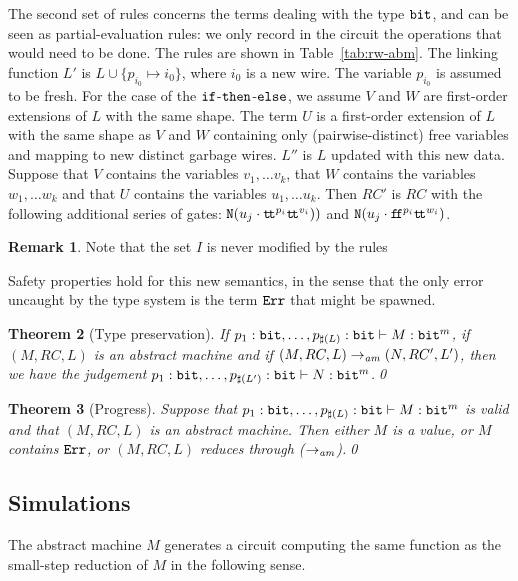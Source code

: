 \documentclass{article}
\theoremstyle{plain}
\newtheorem{theorem}{Theorem}
\theoremstyle{definition}
\newtheorem{remark}[theorem]{Remark}
\newcommand{\bit}{{\tt bit}}
\newcommand{\cnotgate}[2]{{\tt N}({#1}\cdot{#2})}
\newcommand{\ttrue}{\mathtt{t\!t}}
\newcommand{\ffalse}{\mathtt{f\!f}}
\newcommand{\errorlist}{{\tt Err}}
\newcommand{\rwam}{\mathrel{\to_{\it am}}}
\begin{document}
The second set of rules concerns the terms dealing with the type
$\bit$, and can be seen as partial-evaluation rules: we only record
in the circuit
the operations that would need to be done. The rules are shown
in Table~\ref{tab:rw-abm}.  The linking function $L'$ is
$L\cup\{p_{i_0}\mapsto i_0\}$, where $i_0$ is a new wire. The
variable $p_{i_0}$ is assumed to be fresh. 
For the case of the ${\tt if}$-${\tt then}$-${\tt else}$, we assume
$V$ and $W$ are first-order extensions of $L$ with the same shape. The
term $U$ is a first-order extension of $L$ with the same shape as $V$
and $W$ containing only (pairwise-distinct) free variables and mapping
to new distinct garbage wires. $L''$ is $L$ updated with this new
data.  Suppose that $V$ contains the variables $v_1,\ldots v_k$, that
$W$ contains the variables $w_1,\ldots w_k$ and that $U$ contains the
variables $u_1,\ldots u_k$.  Then $RC'$ is $RC$ with the following
additional series of gates:
$\cnotgate{u_j}{\ttrue^{p_i}\ttrue^{v_i})}$ and
$\cnotgate{u_j}{\ffalse^{p_i}\ttrue^{w_i}}$.

\begin{remark}
  Note that the set $I$ is never modified by the rules
\end{remark}

Safety properties hold for this new semantics, in the sense that the
only error uncaught by the type system is the term $\errorlist$ that
might be spawned.

\begin{theorem}[Type preservation]
  If $p_1:\bit,\ldots,p_{\sharp(L)}:\bit\vdash M:\bit^m$, if
  $(M,RC,L)$ is an abstract machine and if $(M,RC,L)\rwam
  (N,RC',L')$, then we have the judgement 
  $p_1:\bit,\ldots,p_{\sharp(L')}:\bit\vdash
  N:\bit^m$.\qed
\end{theorem}

\begin{theorem}[Progress]
  Suppose that $p_1:\bit,\ldots,p_{\sharp(L)}:\bit\vdash M:\bit^m$ is valid and that $(M,RC,L)$ is an abstract
  machine. Then either $M$ is a value, or $M$ contains $\errorlist$, or
  $(M,RC,L)$ reduces through ($\rwam$).\qed
\end{theorem}



\subsection{Simulations}

The abstract machine $M$ generates a circuit computing the same
function as the small-step reduction of $M$ in the following sense.
\end{document}
